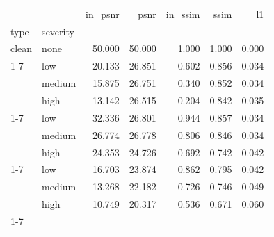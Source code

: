 \begin{tabular}{llrrrrr}
\toprule
 &  & in_psnr & psnr & in_ssim & ssim & l1 \\
type & severity &  &  &  &  &  \\
\midrule
clean & none & 50.000 & 50.000 & 1.000 & 1.000 & 0.000 \\
\cline{1-7}
\multirow[t]{3}{*}{salt_pepper} & low & 20.133 & 26.851 & 0.602 & 0.856 & 0.034 \\
 & medium & 15.875 & 26.751 & 0.340 & 0.852 & 0.034 \\
 & high & 13.142 & 26.515 & 0.204 & 0.842 & 0.035 \\
\cline{1-7}
\multirow[t]{3}{*}{blur} & low & 32.336 & 26.801 & 0.944 & 0.857 & 0.034 \\
 & medium & 26.774 & 26.778 & 0.806 & 0.846 & 0.034 \\
 & high & 24.353 & 24.726 & 0.692 & 0.742 & 0.042 \\
\cline{1-7}
\multirow[t]{3}{*}{occlusion} & low & 16.703 & 23.874 & 0.862 & 0.795 & 0.042 \\
 & medium & 13.268 & 22.182 & 0.726 & 0.746 & 0.049 \\
 & high & 10.749 & 20.317 & 0.536 & 0.671 & 0.060 \\
\cline{1-7}
\bottomrule
\end{tabular}
